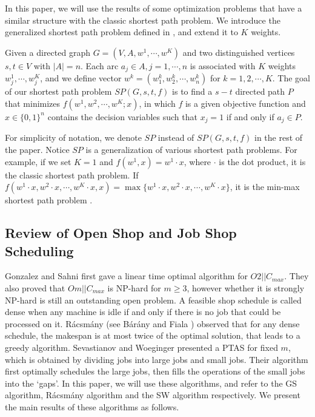 \documentclass{llncs}
\numberwithin{subcase}{case}
\begin{document}
In this paper, we will use the results of some optimization problems that
have a similar structure with the classic shortest path problem. We introduce the generalized shortest path problem defined in \cite{NW13}, and extend it to $K$ weights.

\begin{definition}
Given a directed graph $G = (V, A, w^1, \cdots, w^K)$ and two distinguished vertices $s, t\in V$ with $|A| = n$. Each arc $a_j\in A, j = 1,\cdots,n$ is associated with $K$ weights $w^1_j, \cdots, w^K_j$, and we define vector $w^k = (w^k_1, w^k_2, \cdots, w^k_n)$ for $k=1, 2, \cdots, K$. The goal of our shortest path problem $SP(G, s, t, f)$ is to find a $s-t$ directed path $P$ that minimizes $f(w^1, w^2, \cdots, w^K; x)$, in which $f$ is a given objective function and $x \in \{0, 1\}^n$ contains the decision variables such that $x_j = 1$ if and only if $a_j\in P$.
\label{d_sp}
\end{definition}

For simplicity of notation, we denote $SP$ instead of $SP(G, s, t, f)$ in the rest of the paper. Notice $SP$ is a generalization of various shortest path problems. For example, if we set $K = 1$ and $f(w^1, x) = w^1\cdot x$, where $\cdot$ is the dot product, it is the classic shortest path problem. If $f(w^1\cdot x, w^2\cdot x, \cdots, w^K\cdot x, x) = \max\{w^1\cdot x, w^2\cdot x, \cdots, w^K\cdot x\}$, it is the min-max shortest path problem \cite{ABV06}.

\subsection{Review of Open Shop and Job Shop Scheduling}\label{sec_f2}
Gonzalez and Sahni \cite{Gonzalez1976} first gave a linear time optimal algorithm for $O2||C_{max}$. They also proved that $Om||C_{max}$ is $\mathrm{NP}$-hard for $m\geq 3$, however whether it is strongly $\mathrm{NP}$-hard is still an outstanding open problem. A feasible shop schedule is called dense when any machine is idle if and only if there is no job that could be processed on it. R{\'a}csm{\'a}ny (see B{\' a}r{\' a}ny and Fiala \cite{bt82}) observed that for any dense schedule, the makespan is at most twice of the optimal solution, that leads to a greedy algorithm. Sevastianov and Woeginger \cite{Sevastianov1998} presented a PTAS for fixed $m$, which is obtained by dividing jobs into large jobs and small jobs. Their algorithm first  optimally schedules the large jobs, then fills the operations of the small jobs into the `gaps'. In this paper, we will use these algorithms, and refer to the GS algorithm, R{\'a}csm{\'a}ny algorithm and the SW algorithm respectively. We present the main results of these algorithms as follows.
\end{document}
